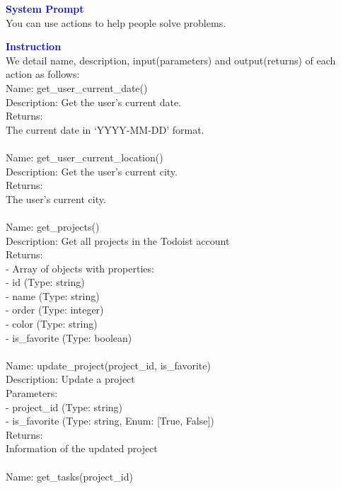 \begin{tcolorbox}[breakable,title=Prompt Details for Todo]
\textbf{\textcolor{blue}{System Prompt}}\\ 
You can use actions to help people solve problems.\\
\textbf{\textcolor{blue}{Instruction}}\\
We detail name, description, input(parameters) and output(returns) of each action as follows:\\
Name: get\_user\_current\_date()\\
Description: Get the user's current date.\\
Returns:\\
The current date in `YYYY-MM-DD' format.\\
\\
Name: get\_user\_current\_location()\\
Description: Get the user's current city.\\
Returns:\\
The user's current city.\\
\\
Name: get\_projects()\\
Description: Get all projects in the Todoist account\\
Returns:\\
- Array of objects with properties:\\
  - id (Type: string)\\
  - name (Type: string)\\
  - order (Type: integer)\\
  - color (Type: string)\\
  - is\_favorite (Type: boolean)\\
\\
Name: update\_project(project\_id, is\_favorite)\\
Description: Update a project\\
Parameters:\\
- project\_id (Type: string)\\
- is\_favorite (Type: string, Enum: [True, False])\\
Returns:\\
Information of the updated project\\
\\
Name: get\_tasks(project\_id)\\

\end{tcolorbox}
